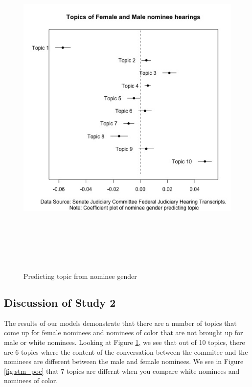 \documentclass [12pt]{article}
\begin{document}
\begin{figure}[H]
    \centering
    \includegraphics[height = 175mm, width = 175mm]{../tables_figures/stm_male_predict.jpg}
    \caption{Predicting topic from nominee gender}
    \label{fig:stm_male}
\end{figure}

\subsection{Discussion of Study 2}

The results of our models demonstrate that there are a number of topics that come up for female nominees and nominees of color that are not brought up for male or white nominees. Looking at Figure \ref{fig:stm_male}, we see that out of 10 topics, there are 6 topics where the content of the conversation between the commitee and the nominees are different between the male and female nominees. We see in Figure \ref{fig:stm_poc} that 7 topics are differnt when you compare white nominees and nominees of color.
\end{document}
